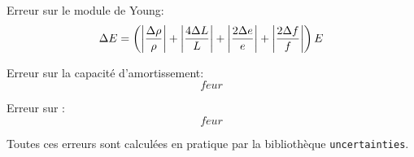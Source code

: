 Erreur sur le module de Young:
\begin{equation}
    \Delta E = \left(\left|\frac{\Delta \rho}{\rho}\right| + \left|\frac{4\Delta L}{L}\right| + \left|\frac{2\Delta e}{e}\right| + \left|\frac{2\Delta f}{f}\right| \right) E
\end{equation}

Erreur sur la capacité d'amortissement:
\begin{equation}
    feur
\end{equation}

Erreur sur :
\begin{equation}
    feur
\end{equation}

Toutes ces erreurs sont calculées en pratique par la bibliothèque \texttt{uncertainties}.
